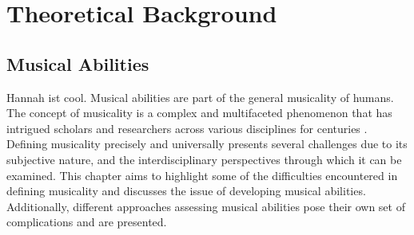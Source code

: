 \chapter{Theoretical Background}
\label{cap:Background}

\section{Musical Abilities}
Hannah ist cool.
Musical abilities are part of the general musicality of humans. The concept of musicality is a complex and multifaceted phenomenon that has intrigued scholars and researchers across various disciplines for centuries \cite{Gembris1987, Pausch2022, Roman-Caballero2018}. Defining musicality precisely and universally presents several challenges due to its subjective nature, and the interdisciplinary perspectives through which it can be examined.  This chapter aims to highlight some of the difficulties encountered in defining musicality and discusses the issue of developing musical abilities. Additionally, different approaches assessing musical abilities pose their own set of complications and are presented.

